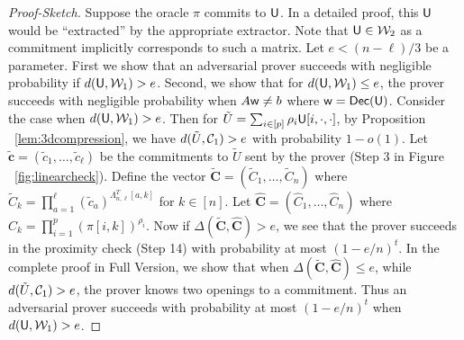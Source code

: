 \begin{proof}[Proof-Sketch]
Suppose the oracle $\pi$ commits to $\mathsf{U}$. In a detailed proof, this $\mathsf{U}$
would be ``extracted'' by the appropriate extractor. Note that $\mathsf{U}\in
\mathcal{W}_2$ as a commitment implicitly corresponds to such a matrix. Let $e<(n-\ell)/3$ be a parameter. First we show that 
an adversarial prover succeeds with negligible probability if $d(\mathsf{U},\mathcal{W}_1)>e$. Second, we
show that for $d(\mathsf{U},\mathcal{W}_1)\leq e$, the prover succeeds with negligible probability when
$A\mathsf{w}\neq b$ where $\mathsf{w}=\mathsf{Dec}(\mathsf{U})$. Consider the case when $d(\mathsf{U},\mathcal{W}_1)>e$. Then for
$\tilde{U}=\sum_{i\in [p]}\rho_i\mathsf{U}[i,\cdot,\cdot]$, by Proposition ~\ref{lem:3dcompression},
 we have $d(\tilde{U},\mathcal{C}_1)>e$ with probability $1-o(1)$. Let $\tilde{\bm{c}}=(\tilde{c}_1,
\ldots,\tilde{c}_\ell)$ be the commitments to $\tilde{U}$ sent by the prover
(Step 3 in Figure ~\ref{fig:linearcheck}). Define 
the vector $\tilde{\bm{C}}=(\tilde{C}_1,\ldots,\tilde{C}_n)$ where
$\tilde{C}_k=\prod_{a=1}^\ell (\tilde{c}_a)^{\Lambda_{n,\ell}^T[a,k]}$ for $k\in [n]$.
 Let $\hat{\bm{C}}=(\hat{C}_1,\ldots,\hat{C}_n)$ where
$\hat{C}_k=\prod_{i=1}^p(\pi[i,k])^{\rho_i}$. Now if
$\Delta(\tilde{\bm{C}},\hat{\bm{C}})>e$, we see that the prover succeeds in the
proximity check (Step 14) with probability at most $(1-e/n)^t$. In the complete proof in
Full Version, we show that when $\Delta(\tilde{\bm{C}},\hat{\bm{C}})\leq e$, 
while $d(\tilde{U},\mathcal{C}_1)>e$, the prover knows two openings to a commitment.
Thus an adversarial prover succeeds with probability at most $(1-e/n)^t$ when
$d(\mathsf{U},\mathcal{W}_1)>e$.


\end{proof}
